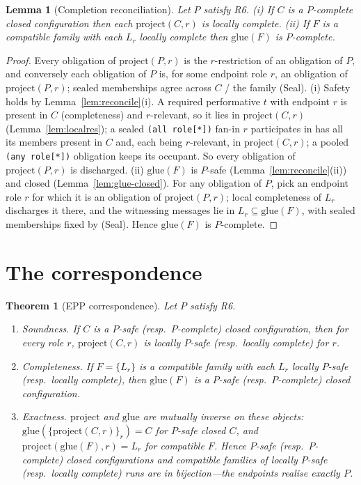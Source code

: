 \documentclass[11pt]{article}
\newcommand{\code}[1]{\texttt{#1}}
\theoremstyle{definition}
\theoremstyle{plain}
\newtheorem{theorem}{Theorem}
\newtheorem{lemma}{Lemma}
\begin{document}
\begin{lemma}[Completion reconciliation]
\label{lem:complete-reconcile}
Let $P$ satisfy R6.
\textup{(i)} If $C$ is a $P$-complete closed configuration then each $\mathrm{project}(C,r)$
is locally complete.
\textup{(ii)} If $F$ is a compatible family with each $L_r$ locally complete then
$\mathrm{glue}(F)$ is $P$-complete.
\end{lemma}
\begin{proof}
Every obligation of $\mathrm{project}(P,r)$ is the $r$-restriction of an obligation of $P$,
and conversely each obligation of $P$ is, for some endpoint role $r$, an obligation of
$\mathrm{project}(P,r)$; sealed memberships agree across $C$ / the family (Seal).
\textup{(i)} Safety holds by Lemma~\ref{lem:reconcile}(i).
A required performative $t$ with endpoint $r$ is present in $C$ (completeness) and
$r$-relevant, so it lies in $\mathrm{project}(C,r)$ (Lemma~\ref{lem:localres}); a sealed
\code{(all role[*])} fan-in $r$ participates in has all its members present in $C$ and,
each being $r$-relevant, in $\mathrm{project}(C,r)$; a pooled \code{(any role[*])} obligation
keeps its occupant.
So every obligation of $\mathrm{project}(P,r)$ is discharged.
\textup{(ii)} $\mathrm{glue}(F)$ is $P$-safe (Lemma~\ref{lem:reconcile}(ii)) and closed
(Lemma~\ref{lem:glue-closed}).
For any obligation of $P$, pick an endpoint role $r$ for which it is an obligation of
$\mathrm{project}(P,r)$; local completeness of $L_r$ discharges it there, and the witnessing
messages lie in $L_r\subseteq\mathrm{glue}(F)$, with sealed memberships fixed by (Seal).
Hence $\mathrm{glue}(F)$ is $P$-complete.
\end{proof}

\section{The correspondence}
\label{sec:corr}

\begin{theorem}[EPP correspondence]
\label{thm:epp}
Let $P$ satisfy R6.
\begin{enumerate}
\item[(1)] \emph{Soundness.} If $C$ is a $P$-safe (resp.\ $P$-complete) closed
configuration, then for every role $r$, $\mathrm{project}(C,r)$ is locally $P$-safe (resp.\
locally complete) for $r$.
\item[(2)] \emph{Completeness.} If $F=\{L_r\}$ is a \emph{compatible} family with each
$L_r$ locally $P$-safe (resp.\ locally complete), then $\mathrm{glue}(F)$ is a $P$-safe
(resp.\ $P$-complete) closed configuration.
\item[(3)] \emph{Exactness.} $\mathrm{project}$ and $\mathrm{glue}$ are mutually inverse on
these objects: $\mathrm{glue}(\{\mathrm{project}(C,r)\}_r)=C$ for $P$-safe closed $C$, and
$\mathrm{project}(\mathrm{glue}(F),r)=L_r$ for compatible $F$.
Hence $P$-safe (resp.\ $P$-complete) closed configurations and compatible families of
locally $P$-safe (resp.\ locally complete) runs are in bijection---the endpoints realise
\emph{exactly} $P$.
\end{enumerate}
\end{theorem}
\end{document}
